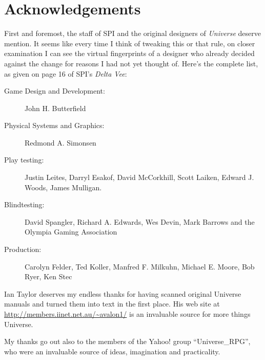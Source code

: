 
\chapter{Acknowledgements}
\label{cha:original-credits}

First and foremost, the staff of SPI and the original designers of
\emph{Universe} deserve mention.  It seems like every time I think of
tweaking this or that rule, on closer examination I can see the
virtual fingerprints of a designer who already decided against the
change for reasons I had not yet thought of.  Here's the complete
list, as given on page 16 of  SPI's \emph{Delta Vee}:

\begin{description}
\item[Game Design and Development:] John H. Butterfield
\item[Physical Systems and Graphics:] Redmond A. Simonsen
\item[Play testing:] Justin Leites, Darryl Esakof, David McCorkhill,
  Scott Laiken, Edward J. Woods, James Mulligan.
\item[Blindtesting:] David Spangler, Richard A. Edwards, Wes Devin,
  Mark Barrows and the Olympia Gaming Association
\item[Production:] Carolyn Felder, Ted Koller, Manfred F. Milkuhn,
  Michael E. Moore, Bob Ryer, Ken Stec
\end{description}
  
Ian Taylor deserves my endless thanks for having scanned original
Universe manuals and turned them into text in the first place.  His
web site at \url{http://members.iinet.net.au/~avalon1/}
is an invaluable source for more things Universe.

My thanks go out also to the members of the Yahoo! group
``Universe{\_}RPG'', who were an invaluable source of ideas,
imagination and practicality.


